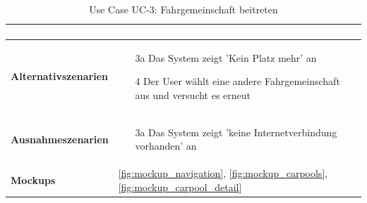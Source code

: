 \begin{table}[ht]
\begin{tabular}{ l | p{10cm} }
\begin{enumerate}
					\end{enumerate}
					\\ \hline
	\textbf{Alternativszenarien}	&	\begin{enumerate}
					\item[3a] Das System zeigt 'Kein Platz mehr' an
					\item[4] Der User wählt eine andere Fahrgemeinschaft aus und versucht es erneut
					\end{enumerate}
					\\ \hline
	\textbf{Ausnahmeszenarien}&	\begin{enumerate}
					\item[3a] Das System zeigt 'keine Internetverbindung vorhanden' an
					\end{enumerate}
					\\ \hline
	\textbf{Mockups}	 	&	\ref{fig:mockup_navigation}, \ref{fig:mockup_carpools}, \ref{fig:mockup_carpool_detail}
  \end{tabular}
   \caption{Use Case UC-3: Fahrgemeinschaft beitreten}\label{table:use_case_3}
\end{table}

